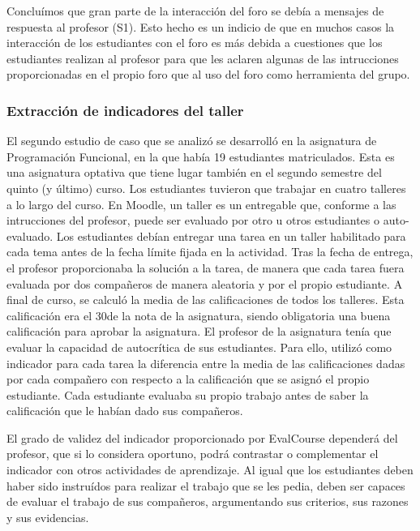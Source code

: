 Concluímos que gran parte de la interacción del foro se debía a mensajes de respuesta al profesor (S1). Esto hecho es un indicio de que en muchos casos la interacción de los estudiantes con el foro es más debida a cuestiones que los estudiantes realizan al profesor para que les aclaren algunas de las intrucciones proporcionadas en el propio foro que al uso del foro como herramienta del grupo.

\subsubsection{Extracción de indicadores del taller}

El segundo estudio de caso que se analizó se desarrolló en la asignatura de Programación Funcional, en la que había 19 estudiantes matriculados. Esta es una asignatura optativa que tiene lugar también en el segundo semestre del quinto (y último) curso. Los estudiantes tuvieron que trabajar en cuatro talleres a lo largo del curso. En Moodle, un taller es un entregable que, conforme a las intrucciones del profesor, puede ser evaluado por otro u otros estudiantes o auto-evaluado. Los estudiantes debían entregar una tarea en un taller habilitado para cada tema antes de la fecha límite fijada en la actividad. Tras la fecha de entrega, el profesor proporcionaba la solución a la tarea, de manera que cada tarea fuera evaluada por dos compañeros de manera aleatoria y por el propio estudiante. A final de curso, se calculó la media de las calificaciones de todos los talleres. Esta calificación era el 30\percentage de la nota de la asignatura, siendo obligatoria una buena calificación para aprobar la asignatura. El profesor de la asignatura tenía que evaluar la capacidad de autocrítica de sus estudiantes. Para ello, utilizó como indicador para cada tarea la diferencia entre la media de las calificaciones dadas por cada compañero con respecto a la calificación que se asignó el propio estudiante. Cada estudiante evaluaba su propio trabajo antes de saber la calificación que le habían dado sus compañeros.

El grado de validez del indicador proporcionado por EvalCourse dependerá del profesor, que si lo considera oportuno, podrá contrastar o complementar el indicador con otros actividades de aprendizaje. Al igual que los estudiantes deben haber sido instruídos para realizar el trabajo que se les pedia, deben ser capaces de evaluar el trabajo de sus compañeros, argumentando sus criterios, sus razones y sus evidencias.

